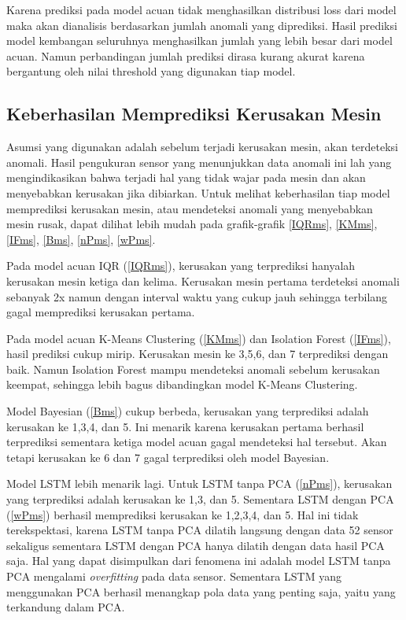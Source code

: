     Karena prediksi pada model acuan tidak menghasilkan distribusi loss dari model maka akan dianalisis berdasarkan jumlah anomali yang diprediksi. Hasil prediksi model kembangan seluruhnya menghasilkan jumlah yang lebih besar dari model acuan. Namun perbandingan jumlah prediksi dirasa kurang akurat karena bergantung oleh nilai threshold yang digunakan tiap model.

    \subsection{Keberhasilan Memprediksi Kerusakan Mesin}

    Asumsi yang digunakan adalah sebelum terjadi kerusakan mesin, akan terdeteksi anomali. Hasil pengukuran sensor yang menunjukkan data anomali ini lah yang mengindikasikan bahwa terjadi hal yang tidak wajar pada mesin dan akan menyebabkan kerusakan jika dibiarkan. Untuk melihat keberhasilan tiap model memprediksi kerusakan mesin, atau mendeteksi anomali yang menyebabkan mesin rusak, dapat dilihat lebih mudah pada grafik-grafik \ref{IQRms}, \ref{KMms}, \ref{IFms}, \ref{Bms}, \ref{nPms}, \ref{wPms}.

    Pada model acuan IQR (\ref{IQRms}), kerusakan yang terprediksi hanyalah kerusakan mesin ketiga dan kelima. Kerusakan mesin pertama terdeteksi anomali sebanyak 2x namun dengan interval waktu yang cukup jauh sehingga terbilang gagal memprediksi kerusakan pertama.

    Pada model acuan K-Means Clustering (\ref{KMms}) dan Isolation Forest (\ref{IFms}), hasil prediksi cukup mirip. Kerusakan mesin ke 3,5,6, dan 7 terprediksi dengan baik. Namun Isolation Forest mampu mendeteksi anomali sebelum kerusakan keempat, sehingga lebih bagus dibandingkan model K-Means Clustering.

    Model Bayesian (\ref{Bms}) cukup berbeda, kerusakan yang terprediksi adalah kerusakan ke 1,3,4, dan 5. Ini menarik karena kerusakan pertama berhasil terprediksi sementara ketiga model acuan gagal mendeteksi hal tersebut. Akan tetapi kerusakan ke 6 dan 7 gagal terprediksi oleh model Bayesian.

    Model LSTM lebih menarik lagi. Untuk LSTM tanpa PCA (\ref{nPms}), kerusakan yang terprediksi adalah kerusakan ke 1,3, dan 5. Sementara LSTM dengan PCA (\ref{wPms}) berhasil memprediksi kerusakan ke 1,2,3,4, dan 5. Hal ini tidak terekspektasi, karena LSTM tanpa PCA dilatih langsung dengan data 52 sensor sekaligus sementara LSTM dengan PCA hanya dilatih dengan data hasil PCA saja. Hal yang dapat disimpulkan dari fenomena ini adalah model LSTM tanpa PCA mengalami \emph{overfitting} pada data sensor. Sementara LSTM yang menggunakan PCA berhasil menangkap pola data yang penting saja, yaitu yang terkandung dalam PCA.

